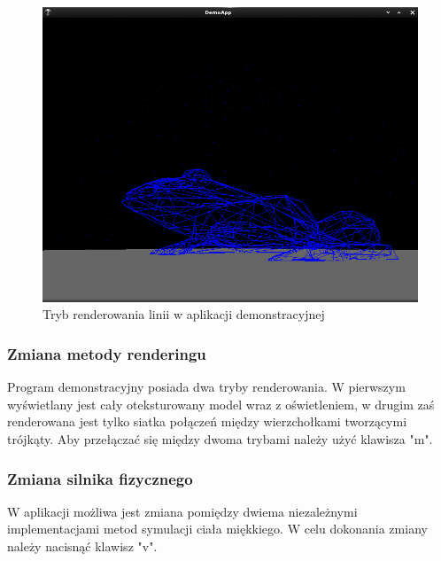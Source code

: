\begin{figure}[H]
\centering
\includegraphics[scale=0.5]{images/z2.jpg}
\caption{Tryb renderowania linii w aplikacji demonstracyjnej}
\end{figure}

\subsubsection{Zmiana metody renderingu}
Program demonstracyjny posiada dwa tryby renderowania. W pierwszym wyświetlany
jest cały oteksturowany model wraz z oświetleniem, w drugim zaś renderowana jest
tylko siatka połączeń między wierzchołkami tworzącymi trójkąty. Aby przełączać
się między dwoma trybami należy użyć klawisza "m".

\subsubsection{Zmiana silnika fizycznego}
W aplikacji możliwa jest zmiana pomiędzy dwiema niezależnymi implementacjami
metod symulacji ciała miękkiego. W celu dokonania zmiany należy nacisnąć klawisz
"v".

